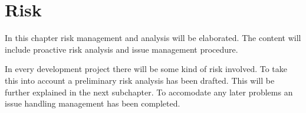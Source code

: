 \chapter{Risk}
In this chapter risk management and analysis will be elaborated. The content will include proactive risk analysis and issue management procedure. 

In every development project there will be some kind of risk involved. To take this into account a preliminary risk analysis has been drafted. This will be further explained in the next subchapter. To accomodate any later problems an issue handling management has been completed. 


